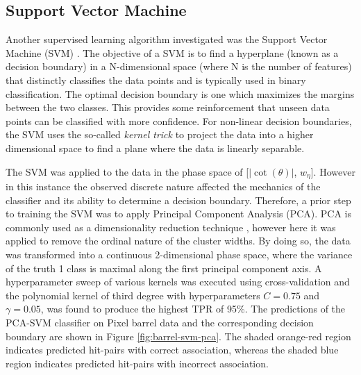 \subsection{Support Vector Machine}


Another supervised learning algorithm investigated was the Support Vector Machine (SVM) \cite{svm}. The objective of a SVM is to find a hyperplane (known as a decision boundary) in a N-dimensional space (where N is the number of features) that distinctly classifies the data points and is typically used in binary classification. The optimal decision boundary is one which maximizes the margins between the two classes. This provides some reinforcement that unseen data points can be classified with more confidence. For non-linear decision boundaries, the SVM uses the so-called \textit{kernel trick} to project the data into a higher dimensional space to find a plane where the data is linearly separable. 

The SVM was applied to the data in the phase space of  [$|\cot(\theta)|$, $w_{\eta}$]. However in this instance the observed discrete nature affected the mechanics of the classifier and its ability to determine a decision boundary. Therefore, a prior step to training the SVM was to apply Principal Component Analysis (PCA). PCA is commonly used as a dimensionality reduction technique \cite{pca}, however here it was applied to remove the ordinal nature of the cluster widths. By doing so, the data was transformed into a continuous 2-dimensional phase space, where the variance of the truth 1 class is maximal along the first principal component axis. A hyperparameter sweep of various kernels was executed using cross-validation and the polynomial kernel of third degree with hyperparameters $C=0.75$ and $\gamma=0.05$, was found to produce the highest TPR of 95\%. The predictions of the PCA-SVM classifier on Pixel barrel data and the corresponding decision boundary are shown in Figure \ref{fig:barrel-svm-pca}. The shaded orange-red region indicates predicted hit-pairs with correct association, whereas the shaded blue region indicates predicted hit-pairs with incorrect association.

